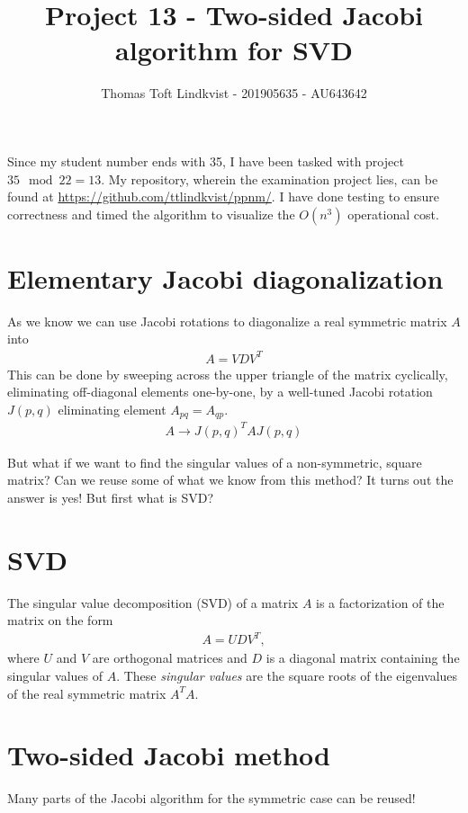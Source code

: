 \documentclass{article}
\title{Project 13 - Two-sided Jacobi algorithm for SVD}
\author{Thomas Toft Lindkvist - 201905635 - AU643642}
\date{}
\begin{document}
    \maketitle
    \noindent
    Since my student number ends with 35, I have been tasked with project $ 35 \mod 22 = 13 $.
    My repository, wherein the examination project lies, can be found at \url{https://github.com/ttlindkvist/ppnm/}.
    I have done testing to ensure correctness and timed the algorithm to visualize the $ O(n^3) $ operational cost.
    
    \section{Elementary Jacobi diagonalization}
    As we know we can use Jacobi rotations to diagonalize a real symmetric matrix $ A $ into
    \begin{align}
    	A = VDV^T
    \end{align}
	This can be done by sweeping across the upper triangle of the matrix cyclically, eliminating off-diagonal elements one-by-one, by a well-tuned Jacobi rotation $ J(p,q) $ eliminating element $ A_{pq}=A_{qp} $.
	\begin{align}
		A \to J(p,q)^T A J(p,q)
	\end{align}
	
	But what if we want to find the singular values of a non-symmetric, square matrix? Can we reuse some of what we know from this method? It turns out the answer is yes! But first what is SVD?
	
	\section{SVD}
	The singular value decomposition (SVD) of a matrix $ A $ is a factorization of the matrix on the form
	\begin{align}
		A = UDV^T,
	\end{align}
	where $ U $ and $ V $ are orthogonal matrices and $ D $ is a diagonal matrix containing the singular values of $ A $. These \textit{singular values} are the square roots of the eigenvalues of the real symmetric matrix $ A^TA $.	
	
    
    \section{Two-sided Jacobi method}
    Many parts of the Jacobi algorithm for the symmetric case can be reused! 
\end{document}
